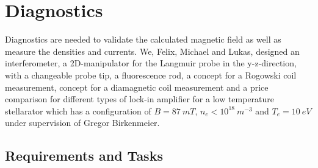 \section{Diagnostics}



Diagnostics are needed to validate the calculated magnetic field as well as measure the densities and currents. We, Felix, Michael and Lukas, designed an interferometer, a 2D-manipulator for the Langmuir probe in the y-z-direction, with a changeable probe tip, a fluorescence rod, a concept for
a Rogowski coil measurement, concept for a diamagnetic coil measurement and a price comparison for different types of lock-in amplifier for a low temperature stellarator which has a configuration of $B=87~\unit{mT}$, $n_e < 10^{18}~\unit{m^{-3}}$ and $T_e=10~\unit{eV}$ under supervision of Gregor Birkenmeier.


\subsection{Requirements and Tasks}


